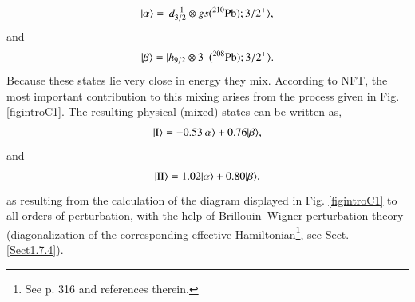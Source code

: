 \begin{align}\label{eqintroC1}
|{\alpha} \rangle=|{d_{3/2}^{-1}\otimes gs (^{210}\text{Pb});3/2^+} \rangle,
\end{align}
and 
\begin{align}\label{eqintroC2}
|{\beta} \rangle=|{h_{9/2}\otimes 3^- (^{208}\text{Pb});3/2^+} \rangle.
\end{align}
Because these states lie very close in energy they mix. According to NFT, the most important contribution to this mixing arises from the process given in Fig. \ref{figintroC1}. The resulting physical (mixed) states can be  written as,
\begin{align}\label{eqintroC3}
|{\text{I}} \rangle=-0.53 |{\alpha} \rangle + 0.76 |{\beta} \rangle,
\end{align}
and 
\begin{align}\label{eqintroC4}
|{\text{II}} \rangle=1.02 |{\alpha} \rangle + 0.80 |{\beta} \rangle,
\end{align}
as resulting from the calculation of the diagram displayed in Fig. \ref{figintroC1} to all orders of perturbation, with the help of Brillouin--Wigner perturbation theory (diagonalization of the corresponding effective Hamiltonian\footnote{See p. 316 \cite{Bortignon:77} and references therein.}, see Sect. \ref{Sect1.7.4}). 



